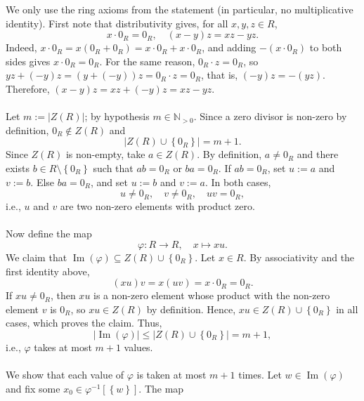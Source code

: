 \begin{solution}
    We only use the ring axioms from the statement (in particular, no multiplicative identity). First note that distributivity gives, for all \( x, y, z \in R \),
    \[
        x \cdot 0_R = 0_R, \quad \left(x - y\right)z = xz - yz.
    \]
    Indeed, \( x \cdot 0_R = x\left(0_R + 0_R\right) = x \cdot 0_R + x \cdot 0_R \), and adding \( -\left(x \cdot 0_R\right) \) to both sides gives \( x \cdot 0_R = 0_R \). For the same reason, \( 0_R \cdot z = 0_R \), so \( yz + \left(-y\right)z = \left(y + \left(-y\right)\right)z = 0_R \cdot z = 0_R \), that is, \( \left(-y\right)z = -\left(yz\right) \). Therefore, \( \left(x - y\right)z = xz + \left(-y\right)z = xz - yz \).
    \\\\
    Let \( m := \left|Z\left(R\right)\right| \); by hypothesis \( m \in \mathbb{N}_{>0} \). Since a zero divisor is non-zero by definition, \( 0_R \notin Z\left(R\right) \) and
    \[
        \left|Z\left(R\right) \cup \left\{0_R\right\}\right| = m + 1.
    \]
    Since \( Z\left(R\right) \) is non-empty, take \( a \in Z\left(R\right) \). By definition, \( a \neq 0_R \) and there exists \( b \in R \setminus \left\{0_R\right\} \) such that \( ab = 0_R \) or \( ba = 0_R \). If \( ab = 0_R \), set \( u := a \) and \( v := b \). Else \( ba = 0_R \), and set \( u := b \) and \( v := a \). In both cases,
    \[
        u \neq 0_R, \quad v \neq 0_R, \quad uv = 0_R,
    \]
    i.e., \( u \) and \( v \) are two non-zero elements with product zero.
    \\\\
    Now define the map
    \[
        \varphi \colon R \to R, \quad x \mapsto xu.
    \]
    We claim that \( \operatorname{Im}\left(\varphi\right) \subseteq Z\left(R\right) \cup \left\{0_R\right\} \). Let \( x \in R \). By associativity and the first identity above,
    \[
        \left(xu\right)v = x\left(uv\right) = x \cdot 0_R = 0_R.
    \]
    If \( xu \neq 0_R \), then \( xu \) is a non-zero element whose product with the non-zero element \( v \) is \( 0_R \), so \( xu \in Z\left(R\right) \) by definition. Hence, \( xu \in Z\left(R\right) \cup \left\{0_R\right\} \) in all cases, which proves the claim. Thus,
    \[
        \left|\operatorname{Im}\left(\varphi\right)\right| \leq \left|Z\left(R\right) \cup \left\{0_R\right\}\right| = m + 1,
    \]
    i.e., \( \varphi \) takes at most \( m + 1 \) values.
    \\\\
    We show that each value of \( \varphi \) is taken at most \( m + 1 \) times. Let \( w \in \operatorname{Im}\left(\varphi\right) \) and fix some \( x_0 \in \varphi^{-1}\left[\left\{w\right\}\right] \). The map

\end{solution}
